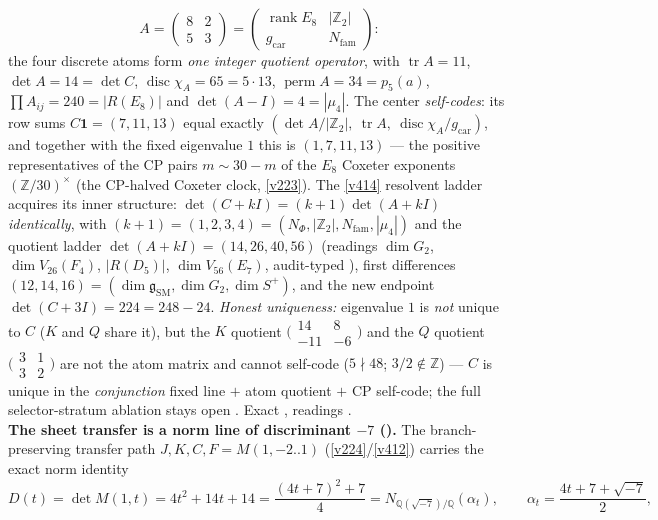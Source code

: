 \documentclass[11pt,a4paper]{article}
\newcommand{\gcar}{g_{\mathrm{car}}}
\newcommand{\Nfam}{N_{\mathrm{fam}}}
\newcommand{\Z}{\mathbb{Z}}
\theoremstyle{definition}
\begin{document}
\begin{keybox}
\[
  A=\begin{pmatrix}8&2\\5&3\end{pmatrix}
   =\begin{pmatrix}\operatorname{rank}E_8&|\Z_2|\\ \gcar&\Nfam\end{pmatrix}:
\]
the four discrete atoms form \emph{one integer quotient operator}, with
$\operatorname{tr}A=11$, $\det A=14=\det C$, $\operatorname{disc}\chi_A=65=5\cdot13$,
$\operatorname{perm}A=34=p_5(a)$, $\prod A_{ij}=240=|R(E_8)|$ and $\det(A{-}I)=4=|\mu_4|$. The center
\emph{self-codes}: its row sums $C\mathbf 1=(7,11,13)$ equal exactly
$(\det A/|\Z_2|,\ \operatorname{tr}A,\ \operatorname{disc}\chi_A/\gcar)$, and together with the fixed
eigenvalue $1$ this is $(1,7,11,13)$ --- the positive representatives of the CP pairs $m\sim30{-}m$ of the
$E_8$ Coxeter exponents $(\Z/30)^\times$ (the CP-halved Coxeter clock, \vref{v223}). The \vref{v414}
resolvent ladder acquires its inner structure: $\det(C{+}kI)=(k{+}1)\det(A{+}kI)$ \emph{identically}, with
$(k{+}1)=(1,2,3,4)=(N_\Phi,|\Z_2|,\Nfam,|\mu_4|)$ and the quotient ladder
$\det(A{+}kI)=(14,26,40,56)$ (readings $\dim G_2$, $\dim V_{26}(F_4)$, $|R(D_5)|$, $\dim V_{56}(E_7)$,
audit-typed \mC), first differences $(12,14,16)=(\dim\mathfrak g_{\mathrm{SM}},\dim G_2,\dim S^+)$, and the
new endpoint $\det(C{+}3I)=224=248-24$. \emph{Honest uniqueness:} eigenvalue $1$ is \emph{not} unique to
$C$ ($K$ and $Q$ share it), but the $K$ quotient
$\big(\begin{smallmatrix}14&8\\-11&-6\end{smallmatrix}\big)$ and the $Q$ quotient
$\big(\begin{smallmatrix}3&1\\3&2\end{smallmatrix}\big)$ are not the atom matrix and cannot self-code
($5\nmid48$; $3/2\notin\Z$) --- $C$ is unique in the \emph{conjunction} fixed line $+$ atom quotient $+$
CP self-code; the full selector-stratum ablation stays open \mO. Exact \mE, readings \mC.
\smallskip\\
\noindent\textbf{The sheet transfer is a norm line of discriminant $-7$
().} The branch-preserving transfer path $J,K,C,F=M(1,-2..1)$
(\vref{v224}/\vref{v412}) carries the exact norm identity
\[
  D(t)=\det M(1,t)=4t^2+14t+14=\frac{(4t+7)^2+7}{4}
      =N_{\mathbb Q(\sqrt{-7})/\mathbb Q}(\alpha_t),\qquad \alpha_t=\frac{4t+7+\sqrt{-7}}2,
\]

\end{keybox}
\end{document}
